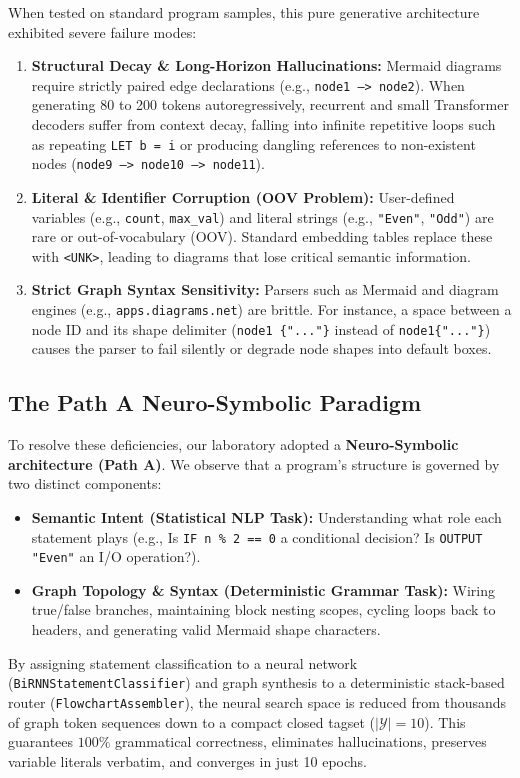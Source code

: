 \documentclass[11pt,a4paper]{article}
\begin{document}
When tested on standard program samples, this pure generative architecture exhibited severe failure modes:
\begin{enumerate}
    \item \textbf{Structural Decay \& Long-Horizon Hallucinations:} Mermaid diagrams require strictly paired edge declarations (e.g., \texttt{node1 --> node2}). When generating 80 to 200 tokens autoregressively, recurrent and small Transformer decoders suffer from context decay, falling into infinite repetitive loops such as repeating \texttt{LET b = i} or producing dangling references to non-existent nodes (\texttt{node9 --> node10 --> node11}).
    \item \textbf{Literal \& Identifier Corruption (OOV Problem):} User-defined variables (e.g., \texttt{count}, \texttt{max\_val}) and literal strings (e.g., \texttt{"Even"}, \texttt{"Odd"}) are rare or out-of-vocabulary (OOV). Standard embedding tables replace these with \texttt{<UNK>}, leading to diagrams that lose critical semantic information.
    \item \textbf{Strict Graph Syntax Sensitivity:} Parsers such as Mermaid and diagram engines (e.g., \texttt{apps.diagrams.net}) are brittle. For instance, a space between a node ID and its shape delimiter (\texttt{node1 \{"..."\}} instead of \texttt{node1\{"..."\}}) causes the parser to fail silently or degrade node shapes into default boxes.
\end{enumerate}

\subsection{The Path A Neuro-Symbolic Paradigm}
To resolve these deficiencies, our laboratory adopted a \textbf{Neuro-Symbolic architecture (Path A)}. We observe that a program's structure is governed by two distinct components:
\begin{itemize}
    \item \textbf{Semantic Intent (Statistical NLP Task):} Understanding what role each statement plays (e.g., Is \texttt{IF n \% 2 == 0} a conditional decision? Is \texttt{OUTPUT "Even"} an I/O operation?).
    \item \textbf{Graph Topology \& Syntax (Deterministic Grammar Task):} Wiring true/false branches, maintaining block nesting scopes, cycling loops back to headers, and generating valid Mermaid shape characters.
\end{itemize}

By assigning statement classification to a neural network (\texttt{BiRNNStatementClassifier}) and graph synthesis to a deterministic stack-based router (\texttt{FlowchartAssembler}), the neural search space is reduced from thousands of graph token sequences down to a compact closed tagset ($|\mathcal{Y}|=10$). This guarantees $100\%$ grammatical correctness, eliminates hallucinations, preserves variable literals verbatim, and converges in just 10 epochs.
\end{document}
